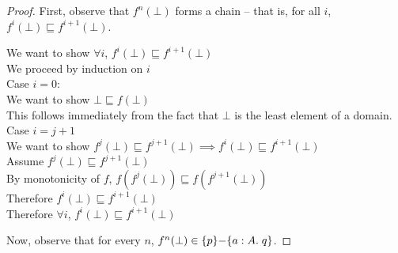 \begin{proof}
First, observe that $f^n(\bot)$ forms a chain -- that is, for all $i$, $f^i(\bot) \sqsubseteq f^{i+1}(\bot)$.
\begin{tabbedproof}
\oo We want to show $\forall i$, $f^i(\bot) \sqsubseteq f^{i+1}(\bot)$ \\
\oo We proceed by induction on $i$ \\
\ooo Case $i = 0$: \\
\oooo We want to show $\bot \sqsubseteq f(\bot)$ \\
\oooo This follows immediately from the fact that $\bot$ is the least element of a domain. \\
\ooo Case $i = j + 1$ \\
\oooo We want to show $f^j(\bot) \sqsubseteq f^{j+1}(\bot) \implies f^i(\bot) \sqsubseteq f^{i+1}(\bot)$ \\
\oooo Assume $f^j(\bot) \sqsubseteq f^{j+1}(\bot)$ \\
\ooooo By monotonicity of $f$, $f(f^j(\bot)) \sqsubseteq f(f^{j+1}(\bot))$ \\
\ooooo Therefore $f^i(\bot) \sqsubseteq f^{i+1}(\bot)$ \\
\oo Therefore $\forall i$, $f^i(\bot) \sqsubseteq f^{i+1}(\bot)$ \\
\end{tabbedproof}

\noindent Now, observe that for every $n$, $f^n(\bot) \in \{{p}\}{-}\{{a:A}.\;{q}\}$. 


\end{proof}
